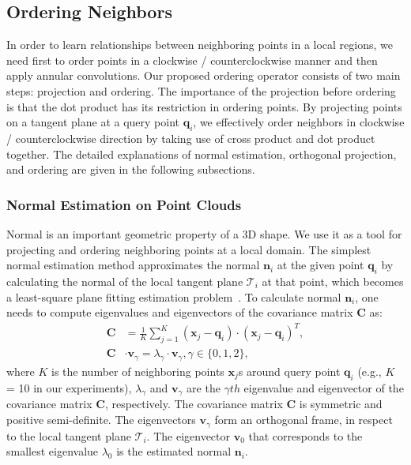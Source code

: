 \documentclass[10pt,twocolumn,letterpaper]{article}
\begin{document}
\subsection{Ordering Neighbors}
\label{sec:project_order}


In order to learn relationships between neighboring points in a local regions, we need first to order points in a clockwise / counterclockwise manner and then apply annular convolutions. Our proposed ordering operator consists of two main steps: projection and ordering. The importance of the projection before ordering is that the dot product has its restriction in ordering points. By projecting points on a tangent plane at a query point $\mathbf{q}_i$, we effectively order neighbors in clockwise / counterclockwise direction by taking use of cross product and dot product together. The detailed explanations of normal estimation, orthogonal projection, and ordering are given in the following subsections.
\vspace{-8mm}
\subsubsection{Normal Estimation on Point Clouds}
\label{sec:normal_estimation}
Normal is an important geometric property of a 3D shape. We use it as a tool for projecting and ordering neighboring points at a local domain. The simplest normal estimation method approximates the normal $\mathbf{n}_i$ at the given point $\mathbf{q}_i$ by calculating the normal of the local tangent plane $\mathcal{T}_i$ at that point, which becomes a least-square plane fitting estimation problem~\cite{RusuDoctoralDissertation}.
To calculate normal $\mathbf{n}_i$, one needs to compute eigenvalues and eigenvectors of the covariance matrix $\mathbf{C}$ as:
\vspace{-2mm}
\begin{equation}
\begin{aligned}
  \mathbf{C} &= \frac{1}{K} \sum_{j=1}^{K} (\mathbf{x}_j - \mathbf{q}_i) \cdot (\mathbf{x}_j - \mathbf{q}_i)^T, \\
  \mathbf{C} &\cdot \mathbf{v}_\gamma = \lambda_\gamma \cdot \mathbf{v}_\gamma, \gamma\in\{0,1,2\},
\end{aligned}
\end{equation}
where $K$ is the number of neighboring points $\mathbf{x}_j$s around query point $\mathbf{q}_i$ (e.g., $K$ = 10 in our experiments), $\lambda_\gamma$ and $\mathbf{v}_\gamma$ are the $\gamma {th}$ eigenvalue and eigenvector of the covariance matrix $\mathbf{C}$, respectively. The covariance matrix $\mathbf{C}$ is symmetric and positive semi-definite. The eigenvectors $\mathbf{v}_\gamma$ form an orthogonal frame, in respect to the local tangent plane $\mathcal{T}_i$. The eigenvector $\mathbf{v}_0$ that corresponds to the smallest eigenvalue $\lambda_0$ is the estimated normal $\mathbf{n}_i$.
\vspace{-3mm}
\end{document}
